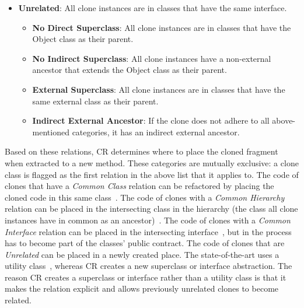 \documentclass[sigconf,review,anonymous]{acmart}
\begin{document}
\begin{itemize}
\begin{itemize}
    \end{itemize}
    \item \textbf{Unrelated}: All clone instances are in classes that have the same interface.
    \begin{itemize}
        \item \textbf{No Direct Superclass}: All clone instances are in classes that have the Object class as their parent.
        \item \textbf{No Indirect Superclass}: All clone instances have a non-external ancestor that extends the Object class as their parent.
        \item \textbf{External Superclass}: All clone instances are in classes that have the same external class as their parent.
        \item \textbf{Indirect External Ancestor}: If the clone does not adhere to all above-mentioned categories, it has an indirect external ancestor.
    \end{itemize}
\end{itemize}

Based on these relations, CR determines where to place the cloned fragment when extracted to a new method. These categories are mutually exclusive: a clone class is flagged as the first relation in the above list that it applies to. The code of clones that have a \textit{Common Class} relation can be refactored by placing the cloned code in this same class~\cite{fowler2018refactoring}. The code of clones with a \textit{Common Hierarchy} relation can be placed in the intersecting class in the hierarchy (the class all clone instances have in common as an ancestor)~\cite{fowler2018refactoring}. The code of clones with a \textit{Common Interface} relation can be placed in the intersecting interface~\cite{mohnen2002interfaces}, but in the process has to become part of the classes' public contract. The code of clones that are \textit{Unrelated} can be placed in a newly created place. The state-of-the-art uses a utility class~\cite{mazinanian2016jdeodorant}, whereas CR creates a new superclass or interface abstraction. The reason CR creates a superclass or interface rather than a utility class is that it makes the relation explicit and allows previously unrelated clones to become related.
\end{document}
